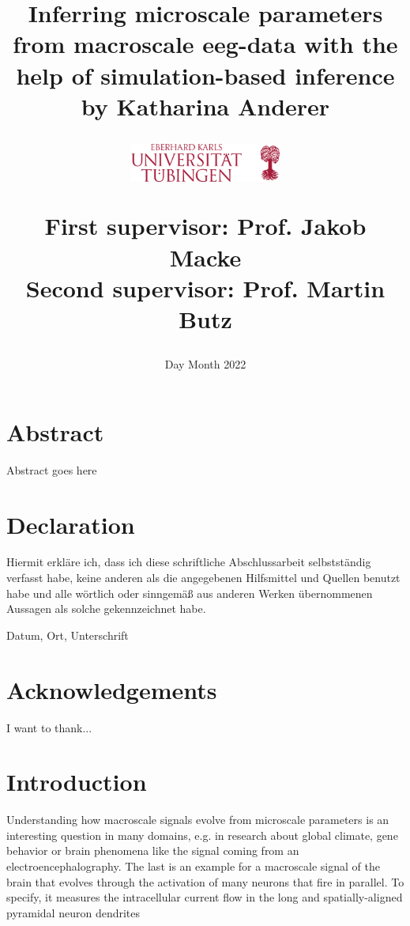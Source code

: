 \documentclass[11pt]{article}
\title{
Inferring microscale parameters from macroscale eeg-data with the help of simulation-based inference\\
\vspace{50px}
{\large by Katharina Anderer}
\vspace{60px}

\hspace{10px}\includegraphics[width=50mm,scale=0.5]{images/UniversitaetTuebingen.png}
\usepackage{stix}
\vspace{60px}
{\large First supervisor: Prof. Jakob Macke}\\
{\large Second supervisor: Prof. Martin Butz}
}
\date{Day Month 2022}
\begin{document}
\maketitle


\chapter*{Abstract}
Abstract goes here


\chapter*{Declaration}
Hiermit erkläre ich, dass ich diese schriftliche Abschlussarbeit selbstständig verfasst habe, keine anderen als die angegebenen Hilfsmittel und Quellen benutzt habe und alle wörtlich oder sinngemäß aus anderen Werken übernommenen Aussagen als solche gekennzeichnet habe.


Datum, Ort, Unterschrift

\chapter*{Acknowledgements}
I want to thank...

\tableofcontents

\chapter*{Introduction}

Understanding how macroscale signals evolve from microscale parameters is an interesting question in many domains, e.g. in research about global climate, gene behavior or brain phenomena like the signal coming from an electroencephalography. 
The last is an example for a macroscale signal of the brain that evolves through the activation of many neurons that fire in parallel. To specify, it measures the intracellular current flow in the long and spatially-aligned pyramidal neuron dendrites \cite{neymotin2020human}
 



\end{document}
